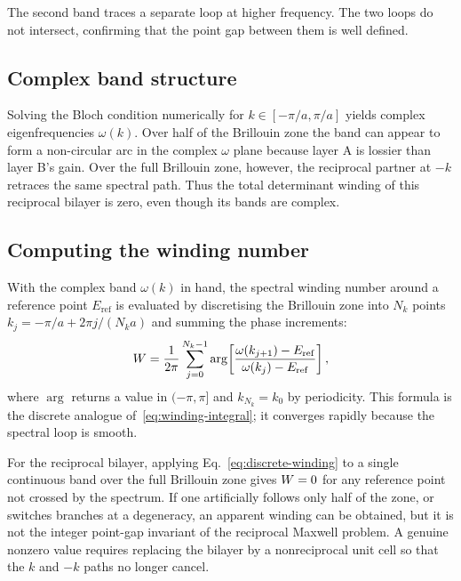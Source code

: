 The second band traces a separate loop at higher frequency. The two
loops do not intersect, confirming that the point gap between them is
well defined.

\subsection{Complex band structure}
\label{ssec:bilayer-bands}

Solving the Bloch condition numerically for $k \in [-\pi/a, \pi/a]$
yields complex eigenfrequencies $\omega(k)$. Over half of the Brillouin
zone the band can appear to form a non-circular arc in the complex
$\omega$ plane because layer A is lossier than layer B's gain. Over the
full Brillouin zone, however, the reciprocal partner at $-k$ retraces
the same spectral path. Thus the total determinant winding of this
reciprocal bilayer is zero, even though its bands are complex.

\subsection{Computing the winding number}
\label{ssec:winding-computation-ch13}

With the complex band $\omega(k)$ in hand, the spectral winding number
around a reference point $E_{\mathrm{ref}}$ is evaluated by discretising
the Brillouin zone into $N_k$ points $k_j = -\pi/a + 2\pi j/(N_k a)$
and summing the phase increments:
\begin{equation}
 W = \frac{1}{2\pi}\sum_{j=0}^{N_k-1}
 \arg\!\left[
 \frac{\omega(k_{j+1}) - E_{\mathrm{ref}}}
 {\omega(k_j) - E_{\mathrm{ref}}}
 \right],
 \label{eq:discrete-winding}
\end{equation}
where $\arg$ returns a value in $(-\pi,\pi]$ and $k_{N_k} = k_0$
by periodicity. This formula is the discrete analogue
of~\eqref{eq:winding-integral}; it converges rapidly because the
spectral loop is smooth.

For the reciprocal bilayer, applying Eq.~\eqref{eq:discrete-winding} to
a single continuous band over the full Brillouin zone gives
$W=0$ for any reference point not crossed by the spectrum. If one
artificially follows only half of the zone, or switches branches at a
degeneracy, an apparent winding can be obtained, but it is not the
integer point-gap invariant of the reciprocal Maxwell problem. A genuine
nonzero value requires replacing the bilayer by a nonreciprocal unit
cell so that the $k$ and $-k$ paths no longer cancel.

